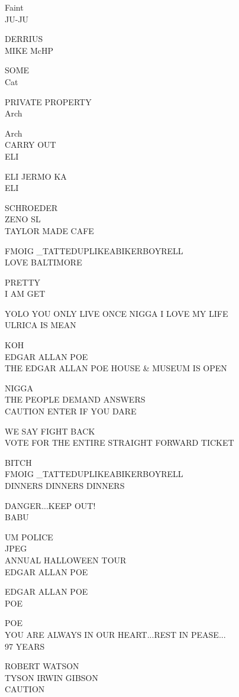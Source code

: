 \documentclass[10pt,letterpaper]{article}
\begin{document}
Faint\\
JU{-}JU

DERRIUS\\
MIKE McHP

SOME\\
Cat

PRIVATE PROPERTY\\
Arch

Arch\\
CARRY OUT\\
ELI

ELI JERMO KA\\
ELI

SCHROEDER\\
ZENO SL\\
TAYLOR MADE CAFE

FMOIG \_TATTEDUPLIKEABIKERBOYRELL\\
LOVE BALTIMORE

PRETTY\\
I AM GET

YOLO YOU ONLY LIVE ONCE NIGGA I LOVE MY LIFE\\
ULRICA IS MEAN

KOH\\
EDGAR ALLAN POE\\
THE EDGAR ALLAN POE HOUSE \& MUSEUM IS OPEN

NIGGA\\
THE PEOPLE DEMAND ANSWERS\\
CAUTION ENTER IF YOU DARE

WE SAY FIGHT BACK\\
VOTE FOR THE ENTIRE STRAIGHT FORWARD TICKET

BITCH\\
FMOIG \_TATTEDUPLIKEABIKERBOYRELL\\
DINNERS DINNERS DINNERS

DANGER...KEEP OUT!\\
BABU

UM POLICE\\
JPEG\\
ANNUAL HALLOWEEN TOUR\\
EDGAR ALLAN POE

EDGAR ALLAN POE\\
POE

POE\\
YOU ARE ALWAYS IN OUR HEART...REST IN PEASE...\\
97 YEARS

ROBERT WATSON\\
TYSON IRWIN GIBSON\\
CAUTION
\end{document}
